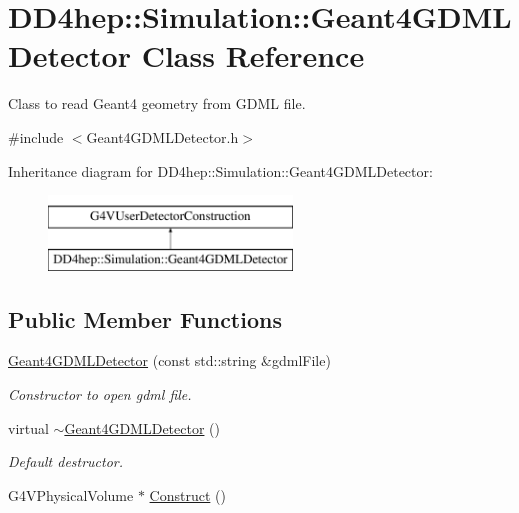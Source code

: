 \hypertarget{class_d_d4hep_1_1_simulation_1_1_geant4_g_d_m_l_detector}{}\section{D\+D4hep\+:\+:Simulation\+:\+:Geant4\+G\+D\+M\+L\+Detector Class Reference}
\label{class_d_d4hep_1_1_simulation_1_1_geant4_g_d_m_l_detector}


Class to read Geant4 geometry from G\+D\+ML file.  




{\ttfamily \#include $<$Geant4\+G\+D\+M\+L\+Detector.\+h$>$}

Inheritance diagram for D\+D4hep\+:\+:Simulation\+:\+:Geant4\+G\+D\+M\+L\+Detector\+:\begin{figure}[H]
\begin{center}
\leavevmode
\includegraphics[height=2.000000cm]{class_d_d4hep_1_1_simulation_1_1_geant4_g_d_m_l_detector}
\end{center}
\end{figure}
\subsection*{Public Member Functions}
\begin{DoxyCompactItemize}
\item 
\hyperlink{class_d_d4hep_1_1_simulation_1_1_geant4_g_d_m_l_detector_a4bdf71880b0a663f8e2954eed4fc891d}{Geant4\+G\+D\+M\+L\+Detector} (const std\+::string \&gdml\+File)
\begin{DoxyCompactList}\small\item\em Constructor to open gdml file. \end{DoxyCompactList}\item 
virtual \hyperlink{class_d_d4hep_1_1_simulation_1_1_geant4_g_d_m_l_detector_aab64ff1905c8d9dc0374ab8eaeade7eb}{$\sim$\+Geant4\+G\+D\+M\+L\+Detector} ()
\begin{DoxyCompactList}\small\item\em Default destructor. \end{DoxyCompactList}\item 
G4\+V\+Physical\+Volume $\ast$ \hyperlink{class_d_d4hep_1_1_simulation_1_1_geant4_g_d_m_l_detector_ad7f7c697e1126a85187e06f94cbd4ad1}{Construct} ()
\end{DoxyCompactItemize}
